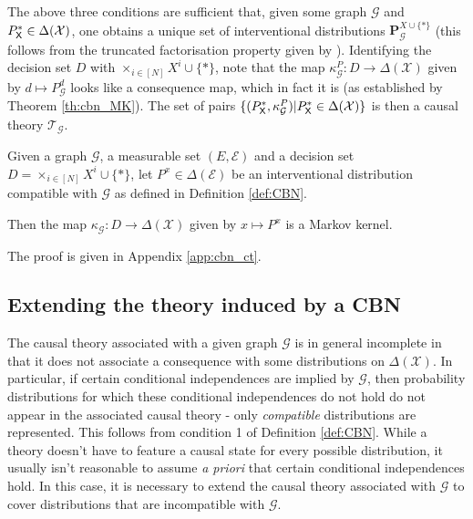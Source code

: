 The above three conditions are sufficient that, given some graph $\mathcal{G}$ and $P^*_{\mathsf{X}}\in \Delta(\mathcal{X})$, one obtains a unique set of interventional distributions $\mathbf{P}_{\mathcal{G}}^{X\cup\{*\}}$ (this follows from the truncated factorisation property given by \cite{pearl_causality:_2009}). Identifying the decision set $D$ with $\times_{i\in [N]} X^i\cup\{*\}$, note that the map $\kappa^P_\mathcal{G}:D\to \Delta(\mathcal{X})$ given by $d\mapsto P^d_{\mathcal{G}}$ looks like a consequence map, which in fact it is (as established by Theorem \ref{th:cbn_MK}). The set of pairs $\{(P^*_{\mathsf{X}}, \kappa^P_\mathcal{G})|P^*_{\mathsf{X}}\in \Delta(\mathcal{X})\}$ is then a causal theory $\mathscr{T}_\mathcal{G}$.

\begin{theorem}\label{th:cbn_MK}
Given a graph $\mathcal{G}$, a measurable set $(E,\mathcal{E})$ and a decision set $D=\times_{i\in [N]} X^i\cup\{*\}$, let $P^x\in \Delta(\mathcal{E})$ be an interventional distribution compatible with $\mathcal{G}$ as defined in Definition \ref{def:CBN}. 

Then the map $\kappa_{\mathcal{G}}:D\to \Delta(\mathcal{X})$ given by $x\mapsto P^x$ is a Markov kernel.
\end{theorem}

The proof is given in Appendix \ref{app:cbn_ct}.

\subsection{Extending the theory induced by a CBN}

The causal theory associated with a given graph $\mathcal{G}$ is in general incomplete in that it does not associate a consequence with some distributions on $\Delta(\mathcal{X})$. In particular, if certain conditional independences are implied by $\mathcal{G}$, then probability distributions for which these conditional independences do not hold do not appear in the associated causal theory - only \emph{compatible} distributions are represented. This follows from condition 1 of Definition \ref{def:CBN}. While a theory doesn't have to feature a causal state for every possible distribution, it usually isn't reasonable to assume \emph{a priori} that certain conditional independences hold. In this case, it is necessary to extend the causal theory associated with $\mathcal{G}$ to cover distributions that are incompatible with $\mathcal{G}$.

